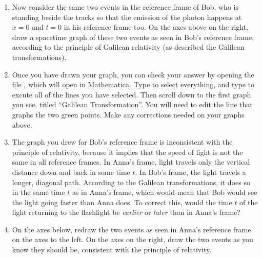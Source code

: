 \begin{enumerate}

\item 
Now consider the same two events in the reference frame of Bob, who is standing beside the tracks so that the emission of the photon  happens at $x=0$ and $t=0$ in his reference frame too.
On the axes above on the right, draw a spacetime graph of these two events as seen in Bob's reference frame, according to the principle of Galilean relativity (as described the Galilean transformations).

\item Once you have drawn your graph, you can check your answer by 
opening the file , which will open in Mathematica.  Type  to select everything, and type  to excute all of the lines you have selected.  Then scroll down to the first graph you see, titled ``Galilean Transformation''.  You will need to edit the line that graphs the two green points.  Make any corrections needed on your graphs above.

\item The graph you drew for Bob's reference frame is inconsistent with the principle of relativity, because it implies that the speed of light is not the same in all reference frames.  In Anna's frame, light travels only the vertical distance down and back in some time $t$.  In Bob's frame, the light travels a longer, diagonal path.  According to the Galilean transformations, it does so in the same time $t$ as in Anna's frame, which would mean that Bob would see the light going faster than Anna does.  To correct this, would the time $t$ of the light returning to the flashlight be \textit{earlier} or \textit{later} than in Anna's frame?
\answerspace{0.4in}

\pagebreak[2]
\item On the axes below, redraw the two events as seen in Anna's reference frame on the axes to the left.  On the axes on the right, draw the two events as you know they should be, consistent with the principle of relativity.

\begin{center}
\hspace{0.2in}
\begin{lab_axis}[lab_noticks_4quads,
	width=1.5in, height=1.5in,
	xlabel={$x$},
	ylabel={$t$},
	title style={at={(0.5,1)}},
	title={Anna's Frame}
	]
\end{lab_axis}
\hspace{0.3in}
\begin{lab_axis}[lab_noticks_4quads,
	width=1.5in, height=1.5in,
	xlabel={$x$},
	ylabel={$t$},
	title style={at={(0.5,1)}},
	title={Bob's Frame}
	]
\end{lab_axis}
\end{center}


\end{enumerate}
